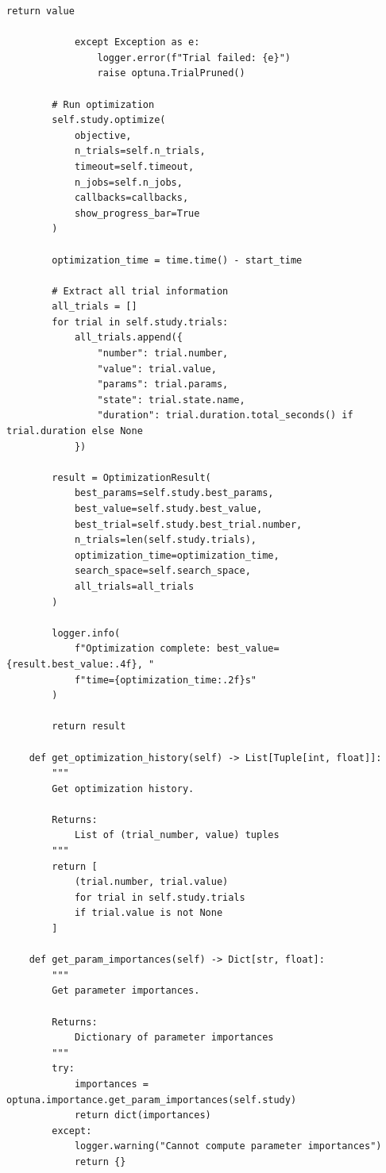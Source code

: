 \begin{lstlisting}[style=python, caption={Hyperparameter optimization with Optuna}]
                return value

            except Exception as e:
                logger.error(f"Trial failed: {e}")
                raise optuna.TrialPruned()

        # Run optimization
        self.study.optimize(
            objective,
            n_trials=self.n_trials,
            timeout=self.timeout,
            n_jobs=self.n_jobs,
            callbacks=callbacks,
            show_progress_bar=True
        )

        optimization_time = time.time() - start_time

        # Extract all trial information
        all_trials = []
        for trial in self.study.trials:
            all_trials.append({
                "number": trial.number,
                "value": trial.value,
                "params": trial.params,
                "state": trial.state.name,
                "duration": trial.duration.total_seconds() if trial.duration else None
            })

        result = OptimizationResult(
            best_params=self.study.best_params,
            best_value=self.study.best_value,
            best_trial=self.study.best_trial.number,
            n_trials=len(self.study.trials),
            optimization_time=optimization_time,
            search_space=self.search_space,
            all_trials=all_trials
        )

        logger.info(
            f"Optimization complete: best_value={result.best_value:.4f}, "
            f"time={optimization_time:.2f}s"
        )

        return result

    def get_optimization_history(self) -> List[Tuple[int, float]]:
        """
        Get optimization history.

        Returns:
            List of (trial_number, value) tuples
        """
        return [
            (trial.number, trial.value)
            for trial in self.study.trials
            if trial.value is not None
        ]

    def get_param_importances(self) -> Dict[str, float]:
        """
        Get parameter importances.

        Returns:
            Dictionary of parameter importances
        """
        try:
            importances = optuna.importance.get_param_importances(self.study)
            return dict(importances)
        except:
            logger.warning("Cannot compute parameter importances")
            return {}



\end{lstlisting}
